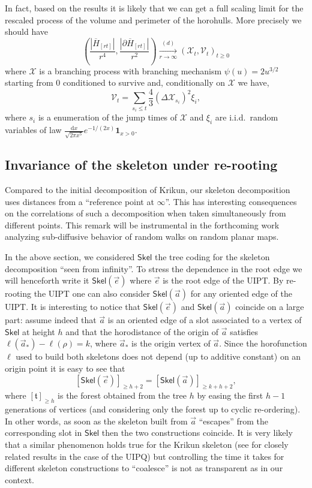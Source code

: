 \documentclass[10pt]{amsart}
\theoremstyle{definition}\newtheorem{defi}[theo]{Definition}\newtheorem{rema}[theo]{Remark}\newtheorem{exam}[theo]{Example}\newtheorem{exem}[theo]{Example}\newtheorem{nota}[theo]{Notation}
\begin{document}
\begin{remark} \label{rem:fullscaling} In fact, based on the results \cite{CLG16,Kr,M} it is likely that we can get a full scaling limit for the rescaled process of the volume and perimeter of the horohulls. More precisely we should have
$$ \left( \frac{| \overline{H}_{[rt]}|}{ r^{4}}, \frac{|\partial \overline{H}_{[rt]}|}{ r^{2}} \right) \xrightarrow[r\to\infty]{(d)} ( \mathcal{X}_{t}, \mathcal{V}_{t})_{t \geq 0}$$ where $ \mathcal{X}$ is a branching process with branching mechanism $\psi(u) = 2 u^{3/2}$  starting from $0$ conditioned to survive and, conditionally on $ \mathcal{X}$ we have,
$$ \mathcal{V}_{t} = \sum_{s_{i} \leq t}  \frac{4}{3}\left(\Delta \mathcal{X}_{s_{i}}\right)^2 \xi_{i},$$ where $s_{i}$ is a enumeration of the jump times of $ \mathcal{X}$ and $\xi_{i}$ are i.i.d.~random variables of law $ \frac{ \mathrm{d}x}{ \sqrt{2\pi x^{5}}}e^{-1/(2x)} \mathbf{1}_{x>0}$.
\end{remark}

\subsection{Invariance of the skeleton under re-rooting}
Compared to the initial decomposition of Krikun, our skeleton decomposition uses distances from a ``reference point at $\infty$''. This has interesting consequences on the correlations of such a decomposition when taken simultaneously from different points. This remark will be instrumental in the forthcoming work \cite{CMrandomwalks} analyzing sub-diffusive behavior of random walks on random planar maps.

In the above section, we considered $ \mathsf{Skel}$ the tree coding for the skeleton decomposition ``seen from infinity''. To stress the dependence in the root edge we will henceforth write it $ \mathsf{Skel}( \vec{e})$ where $\vec{e}$ is the root edge of the UIPT. By re-rooting the UIPT one can also consider $ \mathsf{Skel}( \vec{a})$ for any oriented edge of the UIPT. It is interesting to notice that $ \mathsf{Skel}( \vec{e})$ and $ \mathsf{Skel}( \vec{a})$ coincide on a large part:  assume indeed that $ \vec{a}$ is an oriented edge of a slot associated to a vertex of $ \mathsf{Skel}$ at height $h$ and that the horodistance of the origin of $\vec{a}$ satisfies $\ell( \vec{a}_{*})- \ell( \rho)= k$, where $\vec{a}_{*}$ is the origin vertex of $\vec{a}$. Since the horofunction $\ell$ used to build both skeletons does not depend (up to additive constant) on an origin point it is easy to see that
$$ [ \mathsf{Skel}( \vec{e})]_{\geq h+2} = [ \mathsf{Skel}( \vec{a})]_{\geq k+h+2},$$
where $[ \mathfrak{t}]_{ \geq h}$ is the forest obtained from the tree $h$ by easing the first $h-1$ generations of vertices (and considering only the forest up to cyclic re-ordering). In other words, as soon as the skeleton built from $\vec{a}$ ``escapes'' from the corresponding slot in $ \mathsf{Skel}$ then the two constructions coincide. It is very likely that a similar phenomenon holds true for the Krikun skeleton (see \cite{Kr,CMM10} for closely related results in the case of the UIPQ) but controlling the time it takes for different skeleton constructions to ``coalesce'' is not as transparent as in our context.
\end{document}
